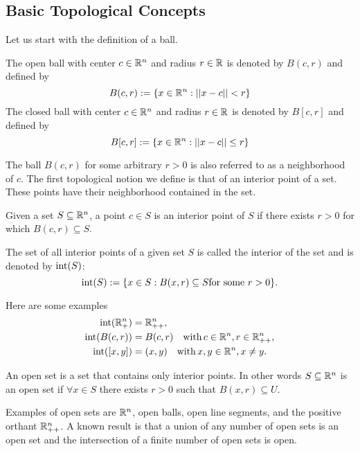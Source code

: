 \documentclass[10pt,a4paper]{article}
\begin{document}
\subsection{Basic Topological Concepts}
Let us start with the definition of a ball.
\begin{definition} The open ball with center $c\in \mathbb{R}^n$ and radius $r \in \mathbb{R}$ is denoted by $B(c,r)$ and defined by 
\begin{equation*}
	B(c,r) := \{x\in\mathbb{R}^n: ||x-c||< r\}
\end{equation*}
The closed ball with center $c\in \mathbb{R}^n$ and radius $r \in \mathbb{R}$ is denoted by $B[c,r]$ and defined by 
\begin{equation*}
B[c,r] := \{x\in\mathbb{R}^n: ||x-c||\leq r\}
\end{equation*}
\end{definition}
The ball $B(c, r)$ for some arbitrary $r>0$ is also referred to as a neighborhood of $c$. The first topological notion we define is that of an interior point of a set. These points have their neighborhood contained in the set.
\begin{definition} Given a set $S \subseteq\mathbb{R}^n$, a point $c\in S$ is an interior point of $S$ if there exists $r>0$ for which $B(c,r) \subseteq S$.
\end{definition}
The set of all interior points of a given set $S$ is called the interior of the set and is denoted by $\mathord{\mathrm{int}}(S)$:
\begin{equation*}
	\mathord{\mathrm{int}}(S) :=\{x\in S: B(x,r)\subseteq S \text{for some } r>0\}.
\end{equation*}
\begin{example}
	Here are some examples 
	\begin{equation*}
		\begin{split}
			\mathord{\mathrm{int}}(\mathbb{R}^n_+) &= \mathbb{R}^n_{++},\\
			\mathord{\mathrm{int}}(B(c,r)) &= B(c,r) \quad \mathord{\mathrm{with }}\, c \in \mathbb{R}^n, r \in \mathbb{R}^n_{++},\\
			\mathord{\mathrm{int}}([x,y]) &= (x,y)\quad \mathord{\mathrm{with }}\, x,y \in \mathbb{R}^n, x\neq y.
		\end{split}
	\end{equation*}
\end{example}
\begin{definition}
	An open set is a set that contains only interior points. In other words $S\subseteq \mathbb{R}^n$ is an open set if $\forall x \in S$ there exists $r>0$ such that $B(x,r)\subseteq U$.
\end{definition}
Examples of open sets are $\mathbb{R}^n$, open balls, open line segments, and the positive orthant $\mathbb{R}^n_{++}$. A known result is that a union of any number of open sets is an open set and the intersection of a finite number of open sets is open.
\end{document}
